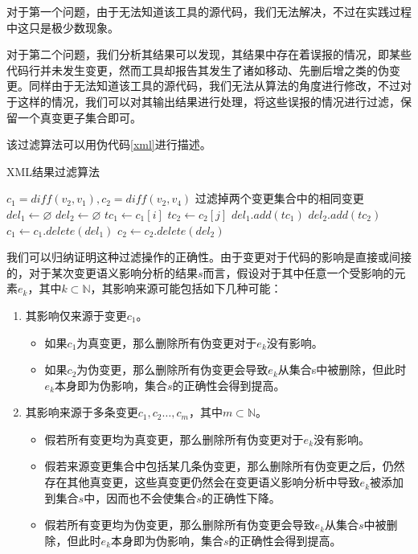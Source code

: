 对于第一个问题，由于无法知道该工具的源代码，我们无法解决，不过在实践过程中这只是极少数现象。

对于第二个问题，我们分析其结果可以发现，其结果中存在着误报的情况，即某些代码行并未发生变更，然而工具却报告其发生了诸如移动、先删后增之类的伪变更。同样由于无法知道该工具的源代码，我们无法从算法的角度进行修改，不过对于这样的情况，我们可以对其输出结果进行处理，将这些误报的情况进行过滤，保留一个真变更子集合即可。

该过滤算法可以用伪代码\ref {xml}进行描述。

\begin{algorithm}
	\caption{XML结果过滤算法}
	\label{xml}
	\begin{algorithmic}[1]
		\Require $c_1 = diff(v_2, v_1), c_2 = diff(v_2,v_4)$
		\Ensure 过滤掉两个变更集合中的相同变更
		\State $del_1 \gets \varnothing$
		\State $del_2 \gets \varnothing$
		\State $tc_1 \gets c_1[i]$
		\State $tc_2 \gets c_2[j]$
		\State $del_1.add(tc_1)$
		\State $del_2.add(tc_2)$
		\EndIf	
		\EndFor
		\EndFor
		\State $c_1 \gets c_1.delete(del_1)$
		\State $c_2 \gets c_2.delete(del_2)$
	\end{algorithmic}
\end{algorithm}

我们可以归纳证明这种过滤操作的正确性。由于变更对于代码的影响是直接或间接的，对于某次变更语义影响分析的结果$s$而言，假设对于其中任意一个受影响的元素$e_k$，其中$k \subset \mathbb{N}$，其影响来源可能包括如下几种可能：
\begin{enumerate}
	\item 其影响仅来源于变更$c_1$。
	\begin{itemize}
		\item 如果$c_1$为真变更，那么删除所有伪变更对于$e_k$没有影响。
		\item 如果$c_2$为伪变更，那么删除所有伪变更会导致$e_k$从集合s中被删除，但此时$e_k$本身即为伪影响，集合$s$的正确性会得到提高。
	\end{itemize}
	\item 其影响来源于多条变更$c_1,c_2\dots,c_m$，其中$m \subset \mathbb{N}$。
	\begin{itemize}
		\item 假若所有变更均为真变更，那么删除所有伪变更对于$e_k$没有影响。
		\item 假若来源变更集合中包括某几条伪变更，那么删除所有伪变更之后，仍然存在其他真变更，这些真变更仍然会在变更语义影响分析中导致$e_k$被添加到集合$s$中，因而也不会使集合$s$的正确性下降。
		\item 假若所有变更均为伪变更，那么删除所有伪变更会导致$e_k$从集合$s$中被删除，但此时$e_k$本身即为伪影响，集合$s$的正确性会得到提高。
	\end{itemize}
\end{enumerate}

